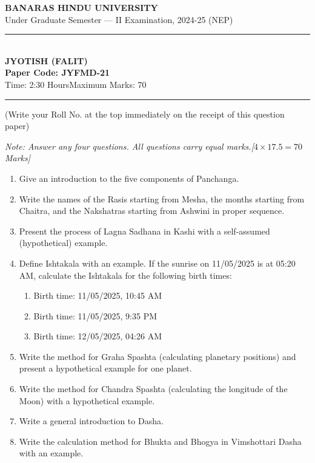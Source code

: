 \documentclass[11pt,a4paper]{article}
\begin{document}
\begin{center}
  {\large\bfseries BANARAS HINDU UNIVERSITY}\\[2pt]
  {\normalsize Under Graduate Semester --- II Examination, 2024-25 (NEP)}\\[6pt]
  \rule{0.8\linewidth}{0.5pt}\\[6pt]
  {\large\bfseries JYOTISH (FALIT)}\\[4pt]
  {\large\bfseries Paper Code: JYFMD-21}\\[4pt]
  {\normalsize Time: 2:30 Hours\hfill Maximum Marks: 70}
\end{center}

\rule{\linewidth}{0.4pt}

\smallskip



\noindent (Write your Roll No. at the top immediately on the receipt of this question paper)

\smallskip



\noindent   \textit{Note: Answer any four questions. All questions carry equal marks.\hfill [$4  \times 17.5 = 70$ Marks]}

\bigskip


\begin{enumerate}[label=   \textbf{\arabic*.}]
    \item Give an introduction to the five components of Panchanga.

    \item Write the names of the Rasis starting from Mesha, the months starting from Chaitra, and the Nakshatras starting from Ashwini in proper sequence.

    \item Present the process of Lagna Sadhana in Kashi with a self-assumed (hypothetical) example.

    \item Define Ishtakala with an example. If the sunrise on 11/05/2025 is at 05:20 AM, calculate the Ishtakala for the following birth times:
    
\begin{enumerate}[label=(\alph*)]
        \item Birth time: 11/05/2025, 10:45 AM
        \item Birth time: 11/05/2025, 9:35 PM
        \item Birth time: 12/05/2025, 04:26 AM
    \end{enumerate}

    \item Write the method for Graha Spashta (calculating planetary positions) and present a hypothetical example for one planet.

    \item Write the method for Chandra Spashta (calculating the longitude of the Moon) with a hypothetical example.

    \item Write a general introduction to Dasha.

    \item Write the calculation method for Bhukta and Bhogya in Vimshottari Dasha with an example.
\end{enumerate}
\end{document}
